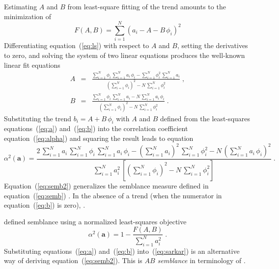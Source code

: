 Estimating $A$ and $B$ from least-square fitting of the trend amounts
to the minimization of
\begin{equation}
\label{eq:ls}
F(A,B) = \sum_{i=1}^N \left(a_i - A - B\,\phi_i\right)^2
\end{equation}
Differentiating equation~(\ref{eq:ls}) with respect to $A$ and $B$,
setting the derivatives to zero, and solving the system of two linear
equations produces the well-known linear fit equations
\begin{eqnarray}
\label{eq:a} 
A & = & \frac{\displaystyle \sum_{i=1}^N \phi_i\,\sum_{i=1}^N a_i\,\phi_i -
\sum_{i=1}^N \phi_i^2\,\sum_{i=1}^N a_i}{\displaystyle 
\left(\sum_{i=1}^N \phi_i\right)^2 - N\,\sum_{i=1}^N \phi_i^2}\;, \\
\label{eq:b}
B & = & \frac{\displaystyle \sum_{i=1}^N \phi_i\,\sum_{i=1}^N a_i -
N\,\sum_{i=1}^N a_i\,\phi_i}{\displaystyle 
\left(\sum_{i=1}^N \phi_i\right)^2 - N\,\sum_{i=1}^N \phi_i^2}\;.
\end{eqnarray}
Substituting the trend $b_i = A + B\,\phi_i$ with $A$ and $B$ defined
from the least-squares equations~(\ref{eq:a}) and~(\ref{eq:b}) into the
correlation coefficient equation~(\ref{eq:alpha}) and squaring the
result leads to	equation 
\begin{equation}
\label{eq:semb2}
\boxed{
\alpha^2(\mathbf{a}) = 
\frac{\displaystyle 2\,\sum_{i=1}^{N} a_i\,\sum_{i=1}^N \phi_i\,
\sum_{i=1}^N a_i\,\phi_i - \left(\sum_{i=1}^{N} a_i\right)^2\,
\sum_{i=1}^N \phi_i^2 -	 N\,\left(\sum_{i=1}^N a_i\,\phi_i\right)^2}
{\displaystyle \sum_{i=1}^{N} a_i^2\,
\left[\left(\sum_{i=1}^N \phi_i\right)^2 - N\,\sum_{i=1}^N \phi_i^2\right]}\;.}
\end{equation}
Equation~(\ref{eq:semb2}) generalizes the semblance measure
\new{$\beta$} defined in equation~(\ref{eq:semb}) . In the absence of
a trend (when the numerator in equation~(\ref{eq:b}) is zero),  .

\cite{GEO66-04-12841293} defined semblance using a 
normalized least-squares objective
\begin{equation}
\label{eq:sarkar}
\alpha^2(\mathbf{a}) = 1 - \frac{F(A,B)}{\displaystyle \sum_{i=1}^{N} a_i^2}\;.
\end{equation}
Substituting equations~(\ref{eq:a}) and~(\ref{eq:b}) into~(\ref{eq:sarkar})
is an alternative way of deriving equation~(\ref{eq:semb2}). This is 
\emph{$AB$ semblance} in terminology of
\cite{GEO66-04-12841293,GEO67-05-16641672}.

